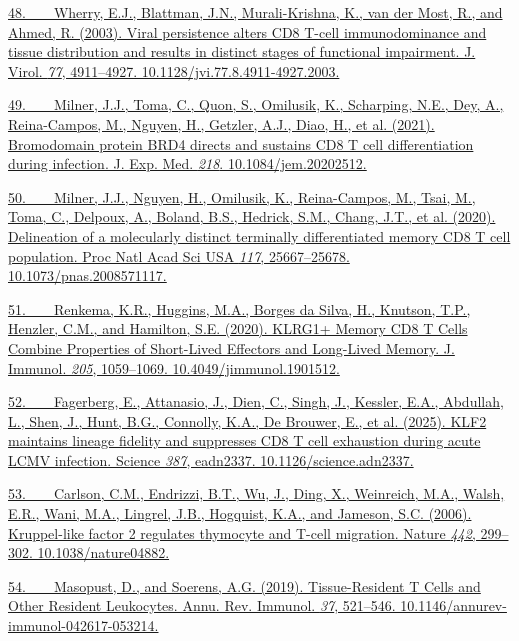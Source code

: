 \href{https://sciwheel.com/work/bibliography/147094}{48.~  Wherry, E.J.,
Blattman, J.N., Murali-Krishna, K., van der Most, R., and Ahmed, R.
(2003). Viral persistence alters CD8 T-cell immunodominance and tissue
distribution and results in distinct stages of functional impairment. J.
Virol. \emph{77}, 4911--4927. 10.1128/jvi.77.8.4911-4927.2003.}

\href{https://sciwheel.com/work/bibliography/11131663}{49.~  Milner,
J.J., Toma, C., Quon, S., Omilusik, K., Scharping, N.E., Dey, A.,
Reina-Campos, M., Nguyen, H., Getzler, A.J., Diao, H., et al. (2021).
Bromodomain protein BRD4 directs and sustains CD8 T cell differentiation
during infection. J. Exp. Med. \emph{218}. 10.1084/jem.20202512.}

\href{https://sciwheel.com/work/bibliography/9725107}{50.~  Milner,
J.J., Nguyen, H., Omilusik, K., Reina-Campos, M., Tsai, M., Toma, C.,
Delpoux, A., Boland, B.S., Hedrick, S.M., Chang, J.T., et al. (2020).
Delineation of a molecularly distinct terminally differentiated memory
CD8 T cell population. Proc Natl Acad Sci USA \emph{117}, 25667--25678.
10.1073/pnas.2008571117.}

\href{https://sciwheel.com/work/bibliography/9493658}{51.~  Renkema,
K.R., Huggins, M.A., Borges da Silva, H., Knutson, T.P., Henzler, C.M.,
and Hamilton, S.E. (2020). KLRG1+ Memory CD8 T Cells Combine Properties
of Short-Lived Effectors and Long-Lived Memory. J. Immunol. \emph{205},
1059--1069. 10.4049/jimmunol.1901512.}

\href{https://sciwheel.com/work/bibliography/17508518}{52.~  Fagerberg,
E., Attanasio, J., Dien, C., Singh, J., Kessler, E.A., Abdullah, L.,
Shen, J., Hunt, B.G., Connolly, K.A., De Brouwer, E., et al. (2025).
KLF2 maintains lineage fidelity and suppresses CD8 T cell exhaustion
during acute LCMV infection. Science \emph{387}, eadn2337.
10.1126/science.adn2337.}

\href{https://sciwheel.com/work/bibliography/329098}{53.~  Carlson,
C.M., Endrizzi, B.T., Wu, J., Ding, X., Weinreich, M.A., Walsh, E.R.,
Wani, M.A., Lingrel, J.B., Hogquist, K.A., and Jameson, S.C. (2006).
Kruppel-like factor 2 regulates thymocyte and T-cell migration. Nature
\emph{442}, 299--302. 10.1038/nature04882.}

\href{https://sciwheel.com/work/bibliography/6419040}{54.~  Masopust,
D., and Soerens, A.G. (2019). Tissue-Resident T Cells and Other Resident
Leukocytes. Annu. Rev. Immunol. \emph{37}, 521--546.
10.1146/annurev-immunol-042617-053214.}

